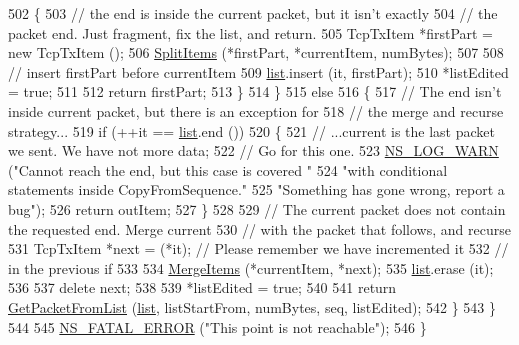 \begin{DoxyCode}
502             \{
503               \textcolor{comment}{// the end is inside the current packet, but it isn't exactly}
504               \textcolor{comment}{// the packet end. Just fragment, fix the list, and return.}
505               TcpTxItem *firstPart = \textcolor{keyword}{new} TcpTxItem ();
506               \hyperlink{classns3_1_1TcpTxBuffer_a34d85565e5a51b10a33444ed47415f2f}{SplitItems} (*firstPart, *currentItem, numBytes);
507 
508               \textcolor{comment}{// insert firstPart before currentItem}
509               \hyperlink{openflow-interface_8h_afd9bcfa176617760671b67580f536fa7}{list}.insert (it, firstPart);
510               *listEdited = \textcolor{keyword}{true};
511 
512               \textcolor{keywordflow}{return} firstPart;
513             \}
514         \}
515       \textcolor{keywordflow}{else}
516         \{
517           \textcolor{comment}{// The end isn't inside current packet, but there is an exception for}
518           \textcolor{comment}{// the merge and recurse strategy...}
519           \textcolor{keywordflow}{if} (++it == \hyperlink{openflow-interface_8h_afd9bcfa176617760671b67580f536fa7}{list}.end ())
520             \{
521               \textcolor{comment}{// ...current is the last packet we sent. We have not more data;}
522               \textcolor{comment}{// Go for this one.}
523               \hyperlink{group__logging_gade7208b4009cdf0e25783cd26766f559}{NS\_LOG\_WARN} (\textcolor{stringliteral}{"Cannot reach the end, but this case is covered "}
524                            \textcolor{stringliteral}{"with conditional statements inside CopyFromSequence."}
525                            \textcolor{stringliteral}{"Something has gone wrong, report a bug"});
526               \textcolor{keywordflow}{return} outItem;
527             \}
528 
529           \textcolor{comment}{// The current packet does not contain the requested end. Merge current}
530           \textcolor{comment}{// with the packet that follows, and recurse}
531           TcpTxItem *next = (*it); \textcolor{comment}{// Please remember we have incremented it}
532                                    \textcolor{comment}{// in the previous if}
533 
534           \hyperlink{classns3_1_1TcpTxBuffer_aee57c32104926f7d4bfdeb12f05a6db1}{MergeItems} (*currentItem, *next);
535           \hyperlink{openflow-interface_8h_afd9bcfa176617760671b67580f536fa7}{list}.erase (it);
536 
537           \textcolor{keyword}{delete} next;
538 
539           *listEdited = \textcolor{keyword}{true};
540 
541           \textcolor{keywordflow}{return} \hyperlink{classns3_1_1TcpTxBuffer_a0528a0261fe39fdb95526c24801f1091}{GetPacketFromList} (\hyperlink{openflow-interface_8h_afd9bcfa176617760671b67580f536fa7}{list}, listStartFrom, numBytes, seq, listEdited);
542         \}
543     \}
544 
545   \hyperlink{group__fatal_ga5131d5e3f75d7d4cbfd706ac456fdc85}{NS\_FATAL\_ERROR} (\textcolor{stringliteral}{"This point is not reachable"});
546 \}
\end{DoxyCode}


